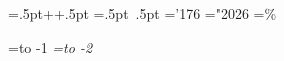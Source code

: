 \newbox\PPbox %
\setbox\PPbox=\hbox{\kern.5pt\hbox{\sevenrm+\kern-1pt+}\kern.5pt}
\def\PP{\copy\PPbox}
\newbox\MMbox \setbox\MMbox=\hbox{\kern.5pt\hbox{\sevensy{}
 \kern-1pt}\kern.5pt}
\def\MM{\copy\MMbox}
\newbox\MGbox %
\setbox\MGbox=\hbox{\kern-2pt\hbox{\teni\char'176}\kern1pt}
\def\MG{\copy\MGbox}
\let\GG=\gg
\let\LL=\ll
\let\NULL=\Lambda
\mathchardef\AND="2026 %
\let\OR=\mid %
\let\XOR=\oplus %
\def\CM{{\sim}} %
\newbox\MODbox \setbox\MODbox=\hbox{\eightrm\%}
\def\MOD{\mathbin{\copy\MODbox}}

\newbox\bak \setbox\bak=\hbox to -1\em{} %
\newbox\bakk\setbox\bakk=\hbox to -2\em{} %

\newcount\ind %
\def\1{\global\advance\ind by1\hangindent\ind \em} %
\def\2{\global\advance\ind by-1} %
\def\3#1{\hfil\penalty#10\hfilneg} %
\def\4{\copy\bak} %
\def\5{\hfil\penalty-1\hfilneg\kern2.5\em\copy\bakk\ignorespaces}%
\def\6{\ifmmode\else\par %
  \hangindent\ind \em\noindent\kern\ind \em\copy\bakk\ignorespaces\fi}
\def\7{\Y\6} %
\def\8{\hskip-\ind \em\hskip 2\em} %

